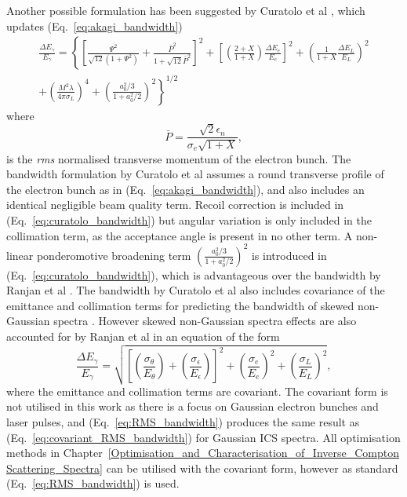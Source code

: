 \documentclass[../main.tex]{subfiles}
\begin{document}
Another possible formulation has been suggested by Curatolo et al \cite{curatolo2017analytical}, which updates (Eq.~\ref{eq:akagi_bandwidth})
\begin{multline}
\frac{\Delta E_{\gamma}}{E_{\gamma}} = \left\{\left[\frac{\Psi^{2}}{\sqrt{12}\left(1+\Psi^{2}\right)}+\frac{\bar{P}^{2}}{1+\sqrt{12}\bar{P}^{2}}\right]^{2}+\left[\left(\frac{2+X}{1+X}\right)\frac{\Delta E_{e}}{E_{e}}\right]^{2}+\left(\frac{1}{1+X}\frac{\Delta E_{L}}{E_{L}}\right)^{2} \right.\\\left. +\left(\frac{M^{2}\lambda}{4\pi\sigma_{L}}\right)^{4}+\left(\frac{a_{0}^{2}/3}{1+a_{0}^{2}/2}\right)^{2}\right\}^{1/2}
\label{eq:curatolo_bandwidth}    
\end{multline}
where 
\begin{equation}
\bar{P} = \frac{\sqrt{2}\epsilon_{n}}{\sigma_{e}\sqrt{1+X}},
\label{eq:curatolo_p_bar}    
\end{equation}
is the \textit{rms} normalised transverse momentum of the electron bunch. The bandwidth formulation by Curatolo et al assumes a round transverse profile of the electron bunch as in (Eq.~\ref{eq:akagi_bandwidth}), and also includes an identical negligible beam quality term. Recoil correction is included in (Eq.~\ref{eq:curatolo_bandwidth}) but angular variation is only included in the collimation term, as the acceptance angle is present in no other term. A non-linear ponderomotive broadening term $\left(\frac{a_{0}^{2}/3}{1+a_{0}^{2}/2}\right)^{2}$ is introduced in (Eq.~\ref{eq:curatolo_bandwidth}), which is advantageous over the bandwidth by Ranjan et al \cite{ranjan2018simulation}. The bandwidth by Curatolo et al \cite{curatolo2017analytical} also includes covariance of the emittance and collimation terms for predicting the bandwidth of skewed non-Gaussian spectra \cite{ranjan2018simulation}. However skewed non-Gaussian spectra effects are also accounted for by Ranjan et al in an equation of the form
\begin{equation}
\frac{\Delta E_{\gamma}}{E_{\gamma}} = \sqrt{\left[\left(\frac{\sigma_{\theta}}{E_{\theta}}\right)+\left(\frac{\sigma_{\epsilon}}{E_{\epsilon}}\right)\right]^{2}+\left(\frac{\sigma_{e}}{E_{e}}\right)^{2}+\left(\frac{\sigma_{L}}{E_{L}}\right)^{2}},
\label{eq:covariant_RMS_bandwidth}    
\end{equation}
where the emittance and collimation terms are covariant. The covariant form is not utilised in this work as there is a focus on Gaussian electron bunches and laser pulses, and (Eq.~\ref{eq:RMS_bandwidth}) produces the same result as (Eq.~\ref{eq:covariant_RMS_bandwidth}) for Gaussian ICS spectra. All optimisation methods in Chapter~\ref{Optimisation_and_Characterisation_of_Inverse_Compton Scattering_Spectra} can be utilised with the covariant form, however as standard (Eq.~\ref{eq:RMS_bandwidth}) is used. 
\end{document}
